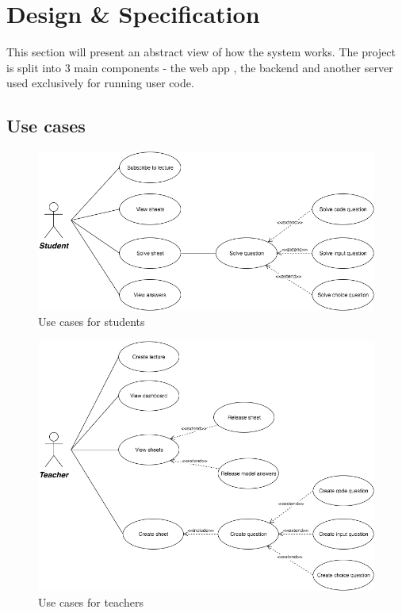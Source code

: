 \chapter{Design \& Specification}

This section will present an abstract view of how the system works.
The project is split into 3 main components - the web app , the backend and another server used exclusively for running user code.




\section{Use cases}
\begin{figure}[H]
  \centering

	\includegraphics[width=\textwidth,height=\textheight,keepaspectratio]{cases}
	\caption{Use cases for students}
\end{figure}

\begin{figure}[H]
  \centering

	\includegraphics[width=\textwidth,height=\textheight,keepaspectratio]{cases2}
	\caption{Use cases for teachers}
\end{figure}

